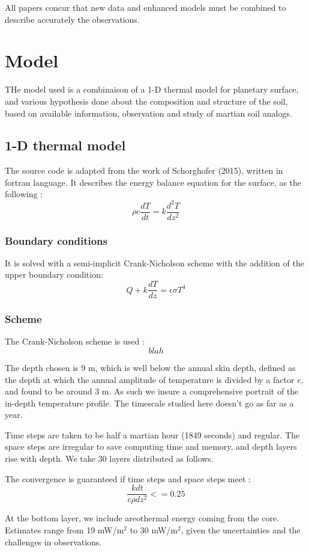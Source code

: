 \documentclass{report}
\begin{document}
All papers concur that new data and enhanced models must be combined to describe accurately the observations. 

\chapter{Model}
THe model used is a combinaison of a 1-D thermal model for planetary surface, and various hypothesis done about the composition and structure of the soil, based on available information, observation and study of martian soil analogs. 

\section{1-D thermal model}
The source code is adapted from the work of Schorghofer (2015), written in fortran language. 
It describes the energy balance equation for the surface, as the following :
\[\rho c \frac{dT}{dt}=k\frac{d^2 T}{dz^2}\]

    \subsection{Boundary conditions}
It is solved with a semi-implicit Crank-Nicholson scheme with the addition of the upper boundary condition: 
\[Q + k \frac{dT}{dz} = \epsilon \sigma T^4\] 

    
    \subsection{Scheme}
The Crank-Nicholson scheme is used :
\[ blah \]

The depth chosen is 9 m, which is well below the annual skin depth, defined as the depth at which the annual amplitude of temperature is divided by a factor $e$, and found to be around 3 m. As such we insure a comprehensive portrait of the in-depth temperature profile. The timescale studied here doesn't go as far as a year.

Time steps are taken to be half a martian hour (1849 seconds) and regular. The space steps are irregular to save computing time and memory, and depth layers rise with depth. We take 30 layers distributed as follows. 

The convergence is guaranteed if time steps and space steps meet : \[\frac{k dt}{c\rho dz^2}<=0.25\] 

At the bottom layer, we include areothermal energy coming from the core. Estimates range from 19 mW/m$^2$ to 30 mW/m$^2$, given the uncertainties and the challenges in observations.
\end{document}
